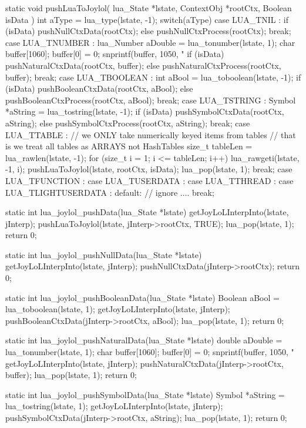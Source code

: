 static void pushLuaToJoylol(
  lua_State  *lstate,
  ContextObj *rootCtx,
  Boolean     isData
) {
  int aType = lua_type(lstate, -1);
  switch(aType) {
  case LUA_TNIL : {
    if (isData) {
      pushNullCtxData(rootCtx);
    } else {
      pushNullCtxProcess(rootCtx);
    }
  } break;
  case LUA_TNUMBER : {
    lua_Number aDouble = lua_tonumber(lstate, 1);
    char buffer[1060];
    buffer[0] = 0;
    snprintf(buffer, 1050, "%
    if (isData) {
      pushNaturalCtxData(rootCtx, buffer);
    } else {
      pushNaturalCtxProcess(rootCtx, buffer);
    }
  } break;
  case LUA_TBOOLEAN : {
    int aBool = lua_toboolean(lstate, -1);
    if (isData) {
      pushBooleanCtxData(rootCtx, aBool);
    } else {
      pushBooleanCtxProcess(rootCtx, aBool);
    }
  } break;
  case LUA_TSTRING : {
    Symbol *aString = lua_tostring(lstate, -1);
    if (isData) {
      pushSymbolCtxData(rootCtx, aString);
    } else {
      pushSymbolCtxProcess(rootCtx, aString);
    }
  } break;
  case LUA_TTABLE : {
    // we ONLY take numerically keyed items from tables
    // that is we treat all tables as ARRAYS not HashTables
    size_t tableLen = lua_rawlen(lstate, -1);
    for (size_t i = 1; i <= tableLen; i++) {
      lua_rawgeti(lstate, -1, i);
      pushLuaToJoylol(lstate, rootCtx, isData);
      lua_pop(lstate, 1);
    }
  } break;
  case LUA_TFUNCTION :
  case LUA_TUSERDATA :
  case LUA_TTHREAD :
  case LUA_TLIGHTUSERDATA :
  default:
    // ignore ....
    break;
  }
}

static int lua_joylol_pushData(lua_State *lstate) {
  getJoyLoLInterpInto(lstate, jInterp);
  pushLuaToJoylol(lstate, jInterp->rootCtx, TRUE);
  lua_pop(lstate, 1);
  return 0;
}

static int lua_joylol_pushNullData(lua_State *lstate) {
  getJoyLoLInterpInto(lstate, jInterp);
  pushNullCtxData(jInterp->rootCtx);
  return 0;
}

static int lua_joylol_pushBooleanData(lua_State *lstate) {
  Boolean aBool = lua_toboolean(lstate, 1);
  getJoyLoLInterpInto(lstate, jInterp);
  pushBooleanCtxData(jInterp->rootCtx, aBool);
  lua_pop(lstate, 1);
  return 0;
}

static int lua_joylol_pushNaturalData(lua_State *lstate) {
  double aDouble = lua_tonumber(lstate, 1);
  char buffer[1060];
  buffer[0] = 0;
  snprintf(buffer, 1050, "%
  getJoyLoLInterpInto(lstate, jInterp);
  pushNaturalCtxData(jInterp->rootCtx, buffer);
  lua_pop(lstate, 1);
  return 0;
}

static int lua_joylol_pushSymbolData(lua_State *lstate) {
  Symbol *aString = lua_tostring(lstate, 1);
  getJoyLoLInterpInto(lstate, jInterp);
  pushSymbolCtxData(jInterp->rootCtx, aString);
  lua_pop(lstate, 1);
  return 0;
}

